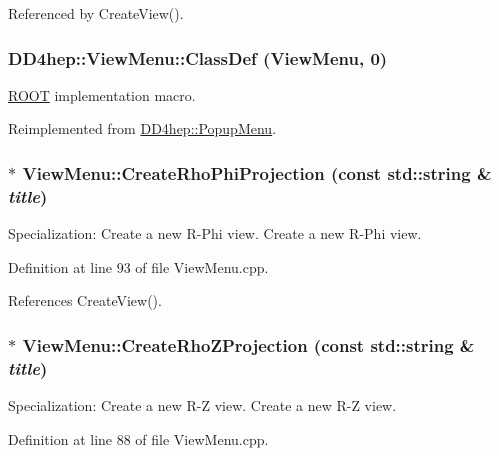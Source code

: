 Referenced by CreateView().\hypertarget{class_d_d4hep_1_1_view_menu_ae114589d23508b5e814581c6b198858b}{
\subsubsection[{ClassDef}]{\setlength{\rightskip}{0pt plus 5cm}DD4hep::ViewMenu::ClassDef ({\bf ViewMenu}, \/  0)}}
\label{class_d_d4hep_1_1_view_menu_ae114589d23508b5e814581c6b198858b}


\hyperlink{namespace_r_o_o_t}{ROOT} implementation macro. 

Reimplemented from \hyperlink{class_d_d4hep_1_1_popup_menu_a8ffb8033e698baa49a05c79c66e0f5c2}{DD4hep::PopupMenu}.\hypertarget{class_d_d4hep_1_1_view_menu_a66ee705a3132333b27a1eed2ea6caeea}{
\subsubsection[{CreateRhoPhiProjection}]{ $\ast$ ViewMenu::CreateRhoPhiProjection (const std::string \& {\em title})}}
\label{class_d_d4hep_1_1_view_menu_a66ee705a3132333b27a1eed2ea6caeea}


Specialization: Create a new R-\/Phi view. Create a new R-\/Phi view. 

Definition at line 93 of file ViewMenu.cpp.

References CreateView().\hypertarget{class_d_d4hep_1_1_view_menu_a1ef807a24d6a871036cd738e45a8cedf}{
\subsubsection[{CreateRhoZProjection}]{ $\ast$ ViewMenu::CreateRhoZProjection (const std::string \& {\em title})}}
\label{class_d_d4hep_1_1_view_menu_a1ef807a24d6a871036cd738e45a8cedf}


Specialization: Create a new R-\/Z view. Create a new R-\/Z view. 

Definition at line 88 of file ViewMenu.cpp.

